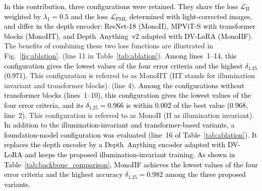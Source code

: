 \documentclass[a4paper,fleqn]{cas-dc}
\begin{document}
% 
\textcolor{black}{ In this contribution, three configurations were retained. They share the loss $\mathcal{L}_\textrm{II}$ weighted by $\lambda_1 = 0.5$ and the loss $\mathcal{L}_\textrm{PML}$ determined with light-corrected images, and differ in the depth encoder: ResNet-18 (MonoII), MPViT-S with transformer blocks (MonoIIT), and Depth~Anything~v2 adapted with DV-LoRA (MonoIIF).} The benefits of combining these two loss functions are illustrated in Fig.~\ref{fig:ablation}. \vspace*{1mm} \newline
%
 (line 11 in Table~\ref{tab:ablation}). \textcolor{black}{Among lines~1--14, this configuration gives the lowest values of the four error criteria and the highest $\delta_{1.25}$ (0.971)}. This configuration is referred to as MonoIIT (IIT stands for illumination invariant and transformer blocks). \vspace*{1mm} \newline
%
 (line 4). \textcolor{black}{Among the configurations without transformer blocks (lines~1--10), this configuration gives the lowest values of the four error criteria, and its $\delta_{1.25}=0.966$ is within 0.002 of the best value (0.968, line~2).} This configuration is referred to as MonoII (II as illumination invariant). 
%
\newline
\textcolor{black}
{
In addition to the illumination-invariant and transformer-based variants, a foundation-model configuration was evaluated (line~16 of Table~\ref{tab:ablation}). It replaces the depth encoder by a Depth~Anything encoder adapted with DV-LoRA and keeps the proposed illumination-invariant training. As shown in Table~\ref{tab:backbone_comparison}, MonoIIF achieves the lowest values of the four error criteria and the highest accuracy $\delta_{1.25}=0.982$ among the three proposed variants.}
%
\end{document}

